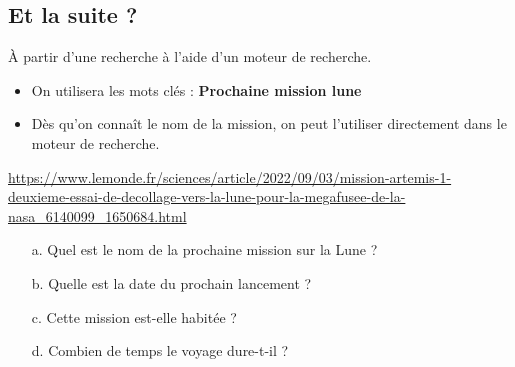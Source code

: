 \subsection*{Et la suite ?}

À partir d'une recherche à l'aide d'un moteur de recherche. 

\begin{itemize}
  \item On utilisera les mots clés : \textbf{Prochaine mission lune}
  \item Dès qu'on connaît le nom de la mission, on peut l'utiliser directement dans le moteur de recherche.
\end{itemize}
\url{https://www.lemonde.fr/sciences/article/2022/09/03/mission-artemis-1-deuxieme-essai-de-decollage-vers-la-lune-pour-la-megafusee-de-la-nasa_6140099_1650684.html}

\begin{enumerate}
  \item[a.] Quel est le nom de la prochaine mission sur la Lune ? \dotfill
  \item[b.] Quelle est la date du prochain lancement ? \dotfill
  \item[c.] Cette mission est-elle habitée ? \dotfill
  \item[d.] Combien de temps le voyage dure-t-il ? \dotfill
\end{enumerate}

